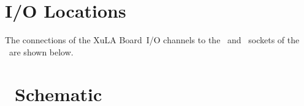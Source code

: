 \documentclass[letterpaper,11pt,oneside]{memoir}
\newcommand{\xula}{XuLA Board}
\renewcommand{\fixedpic}[1]{}
\begin{document}
\appendix


\chapter{I/O Locations}

The connections of the \xula\ I/O channels to the \digpmod\ and \rpi\
sockets of the \product\ are shown below.

\fixedpic{\texttt{[image: channel\_connects.png]}}



\chapter{\ Schematic}

\pagebreak
{}
\end{document}
